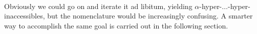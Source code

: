 \

Obviously we could go on and iterate it ad libitum, yielding $\alpha$-hyper-$\ldots$-hyper-inaccessibles, but the nomenclature would be increasingly confusing. A smarter way to accomplish the same goal is carried out in the following section.


\begin{comment}


TODO tohle znamena, ze prvoradovou formuli nerozlisime $V$ od (prvniho) nedosazitelneho $\kappa$

\begin{theorem}\label{th:refl_inaccessible}[Lévy] The following are equivalent:
\bce[(i)]
\item $\kappa$ is inaccessible.
\item For every $R \sub V_\kappa$ and every first-order formula $\varphi(R)$, $\varphi(R)$ reflects in $V_\kappa$.
\item For every $R \sub V_\kappa$, the set $C = \set{\alpha<\kappa}{\langle V_\alpha,\in,R \cap V_\alpha\rangle \el \langle V_\kappa,\in,R \rangle}$ is closed unbounded.
\ece
\end{theorem}
\begin{proof}
Let's start with $\bold{(i)} \then \bold{(iii)}$ in a~way similar to \cite{KanamoriBook}.\newline
The set $\set{\alpha<\kappa}{\langle V_\alpha,\in,R \cap V_\alpha \rangle \el \langle V_\kappa,\in,R\rangle}$ is clearly closed, it remains to show that it is also unbounded.
To do so, let $\alpha<\kappa$ be arbitrary. Define $\alpha_n < \kappa$ for $n\in\omega$ by recursion as follows:\newline
Set $\alpha_0=\alpha$. Given $\alpha_n < \kappa$ define $\alpha_{n+1}$ to be the least $\beta \geq \alpha_n$ such as 
whenever $y_1,\ldots,y_k \in V_{\alpha_n}$ and
$\langle V_{\kappa}, \in, R \rangle \models \exists v_0 \varphi [v_0, y_1, \ldots, y_k ]$
for some formula $\varphi$, there is an $x \in V_{\beta}$ such that $\langle V_{\kappa}, \in, R\rangle \models \varphi [x, y_1, \ldots, y_k]$.
\newline
Since $\kappa$ is inaccessible, $|V_{\alpha_n}| < \kappa$ and so $\alpha_{n+1} < \kappa$.\newline
Finally, set $\alpha = sup({\alpha_n | n \in \omega})$.  %
Then $\langle$
 $V_ \alpha, \in, R  \cap V_\alpha \rangle \prec \langle V_{\kappa}, \in, R\rangle$ by the usual (Tarski) criterion for elementary substructure.

\end{comment}
